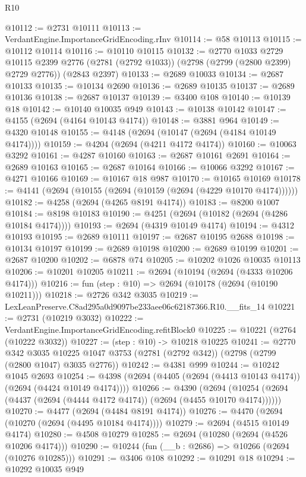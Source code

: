 \begin{lexlean}{R10}
\begin{coremodule}
@10112 := @2731 @10111
@10113 := VerdantEngine.ImportanceGridEncoding.rInv
@10114 := @58 @10113
@10115 := @10112 @10114
@10116 := @10110 @10115
@10132 := @2770
    @1033
    @2729
    @10115
    @2399
    @2776
    (@2781 (@2792 @1033))
    (@2798 (@2799 (@2800 @2399) @2729 @2776))
    (@2843 @2397)
@10133 := @2689 @10033
@10134 := @2687 @10133
@10135 := @10134 @2690
@10136 := @2689 @10135
@10137 := @2689 @10136
@10138 := @2687 @10137
@10139 := @3400 @108
@10140 := @10139 @18
@10142 := @10140 @10035 @949
@10143 := @10138 @10142
@10147 := @4155 (@2694 (@4164 @10143 @4174))
@10148 := @3881 @964
@10149 := @4320 @10148
@10155 := @4148 (@2694 (@10147 (@2694 (@4184 @10149 @4174))))
@10159 := @4204 (@2694 (@4211 @4172 @4174))
@10160 := @10063 @3292
@10161 := @4287 @10160
@10163 := @2687 @10161 @2691
@10164 := @2689 @10163
@10165 := @2687 @10164
@10166 := @10066 @3292
@10167 := @4271 @10166
@10169 := @10167 @18 @987
@10170 := @10165 @10169
@10178 := @4141 (@2694 (@10155 (@2694 (@10159 (@2694 (@4229 @10170 @4174))))))
@10182 := @4258 (@2694 (@4265 @8191 @4174))
@10183 := @8200 @1007
@10184 := @8198 @10183
@10190 := @4251 (@2694 (@10182 (@2694 (@4286 @10184 @4174))))
@10193 := @2694 (@4319 @10149 @4174)
@10194 := @4312 @10193
@10195 := @2689 @10111
@10197 := @2687 @10195 @2688
@10198 := @10134 @10197
@10199 := @2689 @10198
@10200 := @2689 @10199
@10201 := @2687 @10200
@10202 := @6878 @74
@10205 := @10202 @1026 @10035 @10113
@10206 := @10201 @10205
@10211 := @2694 (@10194 (@2694 (@4333 @10206 @4174)))
@10216 := fun (step : @10) => @2694 (@10178 (@2694 (@10190 @10211)))
@10218 := @2726 @342 @3035
@10219 := LexLeanPreserve.C8ad295a0d9097be233aee06c62187366.R10.__fits_14
@10221 := @2731 (@10219 @3032)
@10222 := VerdantEngine.ImportanceGridEncoding.refitBlock0
@10225 := @10221 (@2764 (@10222 @3032))
@10227 := (step : @10) -> @10218 @10225
@10241 := @2770
    @342
    @3035
    @10225
    @1047
    @3753
    (@2781 (@2792 @342))
    (@2798 (@2799 (@2800 @1047) @3035 @2776))
@10242 := @4381 @999
@10244 := @10242 @1045 @2693
@10254 := @4398 (@2694 (@4405 (@2694 (@4413 @10143 @4174)) (@2694 (@4424 @10149 @4174))))
@10266 := @4390
    (@2694 (@10254 (@2694 (@4437 (@2694 (@4444 @4172 @4174)) (@2694 (@4455 @10170 @4174))))))
@10270 := @4477 (@2694 (@4484 @8191 @4174))
@10276 := @4470 (@2694 (@10270 (@2694 (@4495 @10184 @4174))))
@10279 := @2694 (@4515 @10149 @4174)
@10280 := @4508 @10279
@10285 := @2694 (@10280 (@2694 (@4526 @10206 @4174)))
@10290 := @10244 (fun (__b : @2686) => @10266 (@2694 (@10276 @10285)))
@10291 := @3406 @108
@10292 := @10291 @18
@10294 := @10292 @10035 @949

\end{coremodule}
\end{lexlean}
